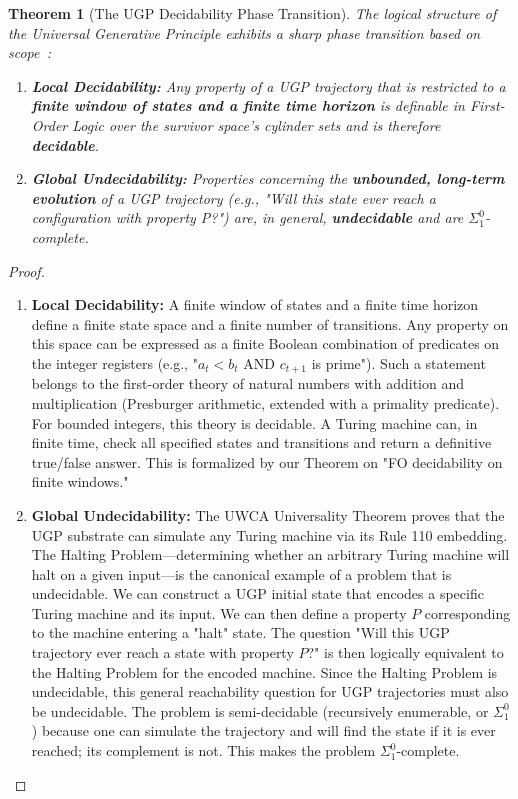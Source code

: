 \documentclass[12pt]{article}
\newtheorem{theorem}{Theorem}[section]
\numberwithin{equation}{section}
\begin{document}
\begin{theorem}[The UGP Decidability Phase Transition]
\label{thm:decidability_transition}
The logical structure of the Universal Generative Principle exhibits a sharp phase transition based on scope~\cite{SpivackUGPFormalization,ugp-lean}:
\begin{enumerate}
    \item \textbf{Local Decidability:} Any property of a UGP trajectory that is restricted to a \textbf{finite window of states and a finite time horizon} is definable in First-Order Logic over the survivor space's cylinder sets and is therefore \textbf{decidable}.
    \item \textbf{Global Undecidability:} Properties concerning the \textbf{unbounded, long-term evolution} of a UGP trajectory (e.g., "Will this state ever reach a configuration with property P?") are, in general, \textbf{undecidable} and are $\Sigma^0_1$-complete.
\end{enumerate}
\end{theorem}
\begin{proof}
\begin{enumerate}[leftmargin=*]
    \item \textbf{Local Decidability:} A finite window of states and a finite time horizon define a finite state space and a finite number of transitions. Any property on this space can be expressed as a finite Boolean combination of predicates on the integer registers (e.g., "$a_t < b_t$ AND $c_{t+1}$ is prime"). Such a statement belongs to the first-order theory of natural numbers with addition and multiplication (Presburger arithmetic, extended with a primality predicate). For bounded integers, this theory is decidable. A Turing machine can, in finite time, check all specified states and transitions and return a definitive true/false answer. This is formalized by our Theorem on "FO decidability on finite windows."
    \item \textbf{Global Undecidability:} The UWCA Universality Theorem proves that the UGP substrate can simulate any Turing machine via its Rule 110 embedding. The Halting Problem—determining whether an arbitrary Turing machine will halt on a given input—is the canonical example of a problem that is undecidable. We can construct a UGP initial state that encodes a specific Turing machine and its input. We can then define a property $P$ corresponding to the machine entering a "halt" state. The question "Will this UGP trajectory ever reach a state with property $P$?" is then logically equivalent to the Halting Problem for the encoded machine. Since the Halting Problem is undecidable, this general reachability question for UGP trajectories must also be undecidable. The problem is semi-decidable (recursively enumerable, or $\Sigma^0_1$) because one can simulate the trajectory and will find the state if it is ever reached; its complement is not. This makes the problem $\Sigma^0_1$-complete.
\end{enumerate}
\end{proof}
\end{document}
